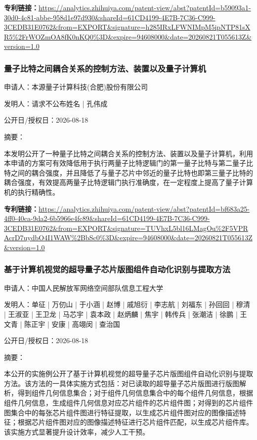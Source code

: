 \documentclass[12pt,a4paper]{ctexart}
\begin{document}
\noindent\textbf{专利链接：}\url{https://analytics.zhihuiya.com/patent-view/abst?patentId=b59093a1-30d0-4c81-abbe-958d1e97d930&shareId=61CD4199-4E7B-7C36-C999-3CEDB31E0762&from=EXPORT&signature=h285IRxLFWNIMpM5ipNTP81sXR5%2FrWOZmOA8fK0nKQ0%3D&expire=94608000&date=20260821T055613Z&version=1.0}

\subsubsection{ 量子比特之间耦合关系的控制方法、装置以及量子计算机 }

申请人：本源量子计算科技(合肥)股份有限公司

发明人：请求不公布姓名 | 孔伟成

公开日/授权日：2026-08-18

摘要：

本发明公开了一种量子比特之间耦合关系的控制方法、装置以及量子计算机，利用本申请的方案可有效降低用于执行两量子比特逻辑门的第一量子比特与第二量子比特之间的耦合强度，并且降低了与量子芯片中邻近的量子比特也即第三量子比特的耦合强度，有效提高两量子比特逻辑门执行准确度，在一定程度上提高了量子计算机的执行精确性。

\noindent\textbf{专利链接：}\url{https://analytics.zhihuiya.com/patent-view/abst?patentId=bf683a25-4ff0-40ca-9da2-6b5966e4fc89&shareId=61CD4199-4E7B-7C36-C999-3CEDB31E0762&from=EXPORT&signature=TUVhxL5bl16LMagOu%2F5VPRAcrD7uydbO4I1WAW%2BbSc0%3D&expire=94608000&date=20260821T055613Z&version=1.0}

\subsubsection{ 基于计算机视觉的超导量子芯片版图组件自动化识别与提取方法 }

申请人：中国人民解放军网络空间部队信息工程大学

发明人：单征 | 万仞山 | 于小涵 | 赵博 | 戚旭衍 | 李志航 | 刘福东 | 孙回回 | 穆清 | 王淑亚 | 王卫龙 | 马芯宇 | 袁本政 | 赵炳麟 | 焦宇 | 韩传兵 | 张潮洁 | 徐鹏 | 王文青 | 陈正宇 | 安康 | 高翊闵 | 查治国

公开日/授权日：2026-08-18

摘要：

本公开的实施例公开了基于计算机视觉的超导量子芯片版图组件自动化识别与提取方法。该方法的一具体实施方式包括：对已读取的超导量子芯片版图进行版图解析，得到组件几何信息集合；对于组件几何信息集合中的每个组件几何信息，根据组件几何信息，生成组件几何信息对应芯片组件的芯片组件图；对得到的芯片组件图集合中的每张芯片组件图进行特征提取，以生成芯片组件图对应的图像描述特征；根据芯片组件图对应的图像描述特征进行芯片组件匹配，以生成芯片组件库。该实施方式显著提升设计效率，减少人工干预。
\end{document}
